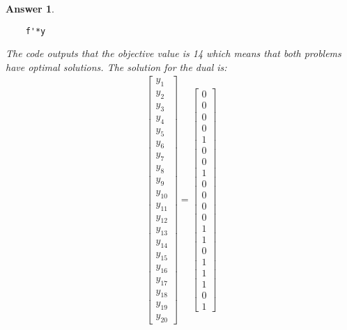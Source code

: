 \documentclass[12pt]{article}
\theoremstyle{colon}
\newtheorem*{answer}{Answer}
\begin{document}
\begin{answer}
\begin{verbatim}
    f'*y
  \end{verbatim}
  The code outputs that the objective value is 14 which means that both problems have optimal solutions. The solution for the dual is:
  \begin{gather*}
    \begin{bmatrix}
          y_1 \\
          y_2 \\
          y_3 \\
          y_4 \\
          y_5 \\
          y_6 \\
          y_7 \\
          y_8 \\
          y_9 \\
          y_{10} \\
          y_{11} \\
          y_{12} \\
          y_{13} \\
          y_{14} \\
          y_{15} \\
          y_{16} \\
          y_{17} \\
          y_{18} \\
          y_{19} \\
          y_{20}
    \end{bmatrix} = \begin{bmatrix}
      0 \\
      0 \\
      0 \\
      0 \\
      1 \\
      0 \\
      0 \\
      1 \\
      0 \\
      0 \\
      0 \\
      0 \\
      1 \\
      1 \\
      0 \\
      1 \\
      1 \\
      1 \\
      0 \\
      1
    \end{bmatrix}
  \end{gather*}
\end{answer}
\end{document}
